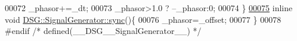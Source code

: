 \begin{DoxyCode}
00072     \_phasor+=\_dt;
00073     \_phasor>1.0 ? --\_phasor:0;
00074 \}
\hypertarget{_signal_generator_8h_source_l00075}{}\hyperlink{class_d_s_g_1_1_signal_generator_a7070f6be04dfd70170328e908b759cd3}{00075} \textcolor{keyword}{inline} \textcolor{keywordtype}{void} \hyperlink{class_d_s_g_1_1_signal_generator_a7070f6be04dfd70170328e908b759cd3}{DSG::SignalGenerator::sync}()\{
00076     \_phasor=\_offset;
00077 \}
00078 \textcolor{preprocessor}{#endif }\textcolor{comment}{/* defined(\_\_DSG\_\_SignalGenerator\_\_) */}\textcolor{preprocessor}{}
\end{DoxyCode}
